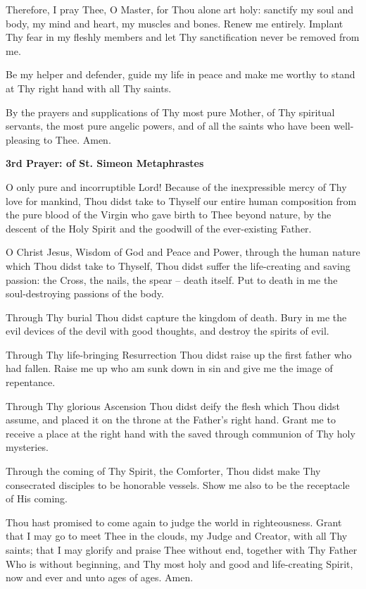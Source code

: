 Therefore, I pray Thee, O Master, for Thou alone art holy: sanctify my soul and body, my mind and heart, my muscles and bones. Renew me entirely. Implant Thy fear in my fleshly members and let Thy sanctification never be removed from me. 

Be my helper and defender, guide my life in peace and make me worthy to stand at Thy right hand with all Thy saints.

By the prayers and supplications of Thy most pure Mother, of Thy spiritual servants, the most pure angelic powers, and of all the saints who have been well-pleasing to Thee. Amen. 

\begin{center}
	\textbf{3rd Prayer: of St. Simeon Metaphrastes}
\end{center}

O only pure and incorruptible Lord! Because of the inexpressible mercy of Thy love for mankind, Thou didst take to Thyself our entire human composition from the pure blood of the Virgin who gave birth to Thee beyond nature, by the descent of the Holy Spirit and the goodwill of the ever-existing Father.

O Christ Jesus, Wisdom of God and Peace and Power, through the human nature which Thou didst take to Thyself, Thou didst suffer the life-creating and saving passion: the Cross, the nails, the spear -- death itself. Put to death in me the soul-destroying passions of the body. 

Through Thy burial Thou didst capture the kingdom of death. Bury in me the evil devices of the devil with good thoughts, and destroy the spirits of evil.

Through Thy life-bringing Resurrection Thou didst raise up the first father who had fallen. Raise me up who am sunk down in sin and give me the image of repentance.

Through Thy glorious Ascension Thou didst deify the flesh which Thou didst assume, and placed it on the throne at the Father's right hand. Grant me to receive a place at the right hand with the saved through communion of Thy holy mysteries.

Through the coming of Thy Spirit, the Comforter, Thou didst make Thy consecrated disciples to be honorable vessels. Show me also to be the receptacle of His coming. 

Thou hast promised to come again to judge the world in righteousness. Grant that I may go to meet Thee in the clouds, my Judge and Creator, with all Thy saints; that I may glorify and praise Thee without end, together with Thy Father Who is without beginning, and Thy most holy and good and life-creating Spirit, now and ever and unto ages of ages. Amen. 

